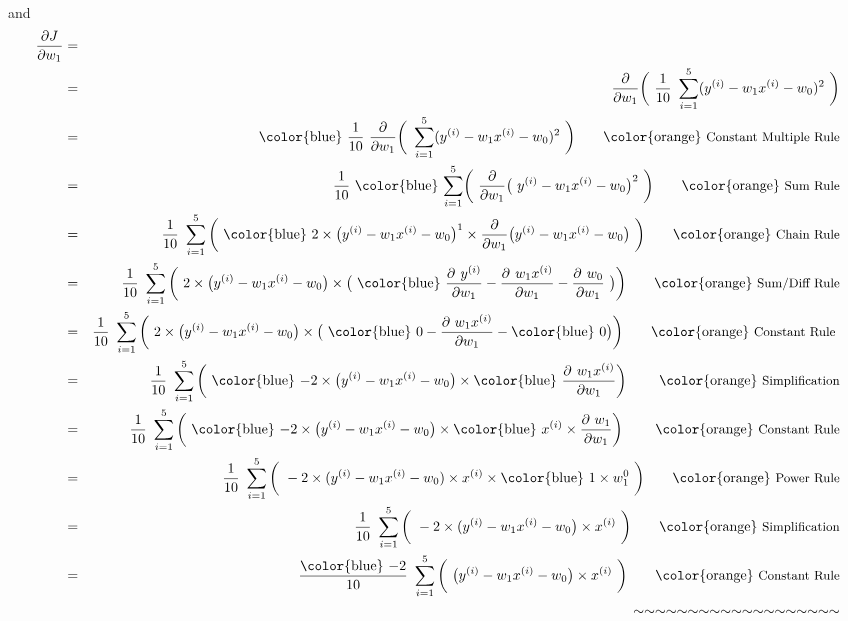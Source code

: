 \documentclass[12pt]{article}
\newcommand{\afmod}[1]{\text{{\color{blue} \textbf{$#1$}}}}
\newcommand{\qtext}[1]{\qquad \text{{\color{orange} \small{#1}}}}
\begin{document}
\vspace{4mm} \\
\noindent and
\vspace{3mm} \\

\begin{eqnarray*}
\frac{\partial J}{\partial w_1} & = &  \\
& = & \frac{\partial}{\partial w_1} \bigg(\ \frac{1}{10} \ \sum_{i=1}^{5} (y^{(i)} - w_1x^{(i)} - w_0)^2\ \bigg) \\
& = & \afmod{\frac{1}{10}} \ \frac{\partial}{\partial w_1} \bigg(\  \sum_{i=1}^{5} (y^{(i)} - w_1x^{(i)} - w_0)^2\ \bigg)
 \qtext{Constant Multiple Rule} \\
& = & \frac{1}{10} \ \afmod{\sum_{i=1}^{5}} \bigg(\ \frac{\partial}{\partial w_1} \big(\ y^{(i)} - w_1x^{(i)} - w_0\big)^2\ \bigg) \qtext{Sum Rule} \\
& = & \frac{1}{10} \ \sum_{i=1}^{5} \bigg(\ \afmod{2 \times \big(y^{(i)} - w_1x^{(i)} - w_0 \big)^1 \times \frac{\partial}{\partial w_1} \big(y^{(i)} - w_1x^{(i)} - w_0 \big)}\ \bigg) \qtext{Chain Rule} \\
& = & \frac{1}{10} \ \sum_{i=1}^{5} \bigg(\ 2 \times \big(y^{(i)}-w_1x^{(i)}-w_0 \big) \times \big(\ \afmod{\frac{\partial\ y^{(i)}}{\partial w_1} - \frac{\partial\ w_1x^{(i)}}{\partial w_1} - \frac{\partial\ w_0}{\partial w_1}} \ \big) \bigg) \qtext{Sum/Diff Rule} \\
& = & \frac{1}{10} \ \sum_{i=1}^{5} \bigg(\ 2 \times \big(y^{(i)} - w_1x^{(i)} - w_0 \big) \times \big(\ \afmod{0} - \frac{\partial\ w_1x^{(i)}}{\partial w_1} - \afmod{0} \big) \bigg) \qtext{Constant Rule } \\
& = & \frac{1}{10} \ \sum_{i=1}^{5} \bigg(\ \afmod{-}2 \times \big( y^{(i)} - w_1x^{(i)} - w_0 \big) \times \afmod{\frac{\partial\ w_1x^{(i)}}{\partial w_1}}\bigg)\ \qtext{Simplification} \\
& = & \frac{1}{10} \ \sum_{i=1}^{5} \bigg(\ \afmod{-}2 \times \big( y^{(i)} - w_1x^{(i)} - w_0 \big) \times \afmod{x^{(i)}} \times \frac{\partial\ w_1}{\partial w_1}\bigg)\ \qtext{Constant Rule} \\
& = & \frac{1}{10} \ \sum_{i=1}^{5} \bigg(\ -2 \times (y^{(i)} - w_1x^{(i)} - w_0) \times x^{(i)} \times \afmod{1 \times w_1^0} \ \bigg) \qtext{Power Rule} \\
& = & \frac{1}{10} \ \sum_{i=1}^{5} \bigg(\ -2 \times (y^{(i)} - w_1x^{(i)} - w_0 \big) \times x^{(i)} \ \bigg) \qtext{Simplification} \\
& = & \frac{\afmod{-2}}{10} \ \sum_{i=1}^{5} \bigg( \ \big( y^{(i)} - w_1x^{(i)} - w_0 \big) \times x^{(i)} \ \bigg) \qtext{Constant Rule}\\
& & \quad \sim \sim \sim \sim \sim \sim \sim \sim \sim \sim \sim \sim \sim \sim \sim \sim \sim \sim \sim \\  
\end{eqnarray*} 
 
\end{document}
